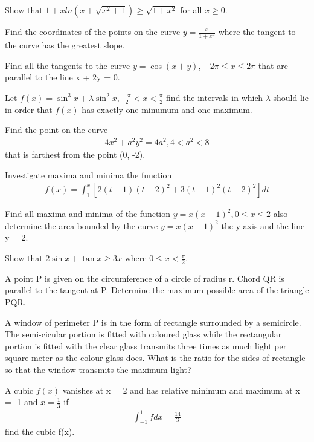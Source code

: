 \item Show that $1 + xln(x + \sqrt{x^2 + 1}) \geq \sqrt{1 + x^2}$ for all $x \geq 0$.

\item Find the coordinates of the points on the curve $y = \frac{x}{1 + x^2}$ where the tangent to the curve has the greatest slope.

\item Find all the tangents to the curve $y = \cos(x + y)$, $-2\pi \leq x \leq 2\pi$ that are parallel to the line 
x + 2y = 0.

\item Let $f(x) = \sin^3 x + \lambda \sin^2 x$, $\frac{-\pi}{2} < x < \frac{\pi}{2}$ find the intervals in which 
$\lambda$ should lie in order that $f(x)$ has exactly one minumum and one maximum.

\item Find the point on the curve 
\begin{align*}
4x^2 + a^2y^2 = 4a^2, 4 < a^2 < 8 
\end{align*}
that is farthest from the point (0, -2).

\item Investigate maxima and minima the function
\begin{align*}
f(x) = \int_{1}^{x}[2(t - 1)(t - 2)^2 + 3(t - 1)^2(t - 2)^2]dt
\end{align*}

\item Find all maxima and minima of the function $y = x(x - 1)^2, 0 \leq x \leq 2$ also determine the area bounded by the curve $y = x(x - 1)^2$ the y-axis and the line y = 2.

\item Show that $2\sin x + \tan x \geq 3x$ where $0 \leq x < \frac{\pi}{2}$.

\item A point P is given on the circumference of a circle of radius r. Chord QR is parallel to the tangent at P. Determine the maximum possible area of the triangle PQR.

\item A window of perimeter P is in the form of rectangle surrounded by a semicircle. The semi-cicular portion is fitted with coloured glass while the rectangular portion is fitted with the clear glass transmits three times as much light per square meter as the colour glass does. What is the ratio for the sides of rectangle so that the window transmits the maximum light?

\item A cubic $f(x)$ vanishes at x = 2 and has relative minimum and maximum at x = -1 and $x = \frac{1}{3}$ if 
\begin{align*}
\int_{-1}^{1}fdx = \frac{14}{3}
\end{align*}
find the cubic f(x).

